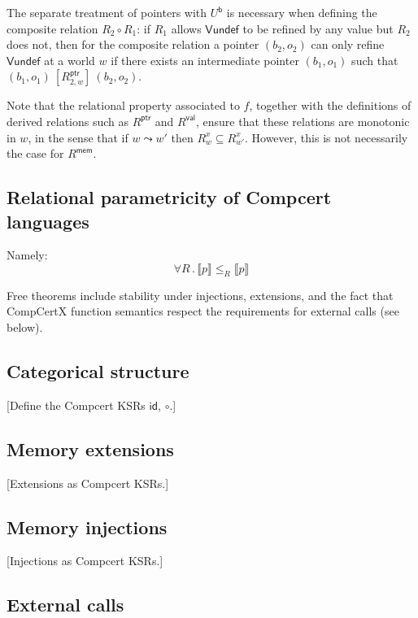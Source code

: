 \documentclass[sigplan,10pt,review,anonymous]{acmart}
\newcommand{\kw}[1]{\ensuremath{ \textsf{#1} }}
\newcommand{\ifr}[1]{\ [{#1}]\ }
\begin{document}
The separate treatment of pointers with $U^\kw{b}$
is necessary when defining the composite relation $R_2 \circ R_1$:
if $R_1$ allows \kw{Vundef} to be refined by any value
but $R_2$ does not,
then for the composite relation
a pointer $(b_2, o_2)$ can only refine \kw{Vundef} at a world $w$
if there exists an intermediate pointer $(b_1, o_1)$
such that $(b_1, o_1) \ifr{R_{2,w}^\kw{ptr}} (b_2, o_2)$.

Note that the relational property associated to $f$,
together with the definitions of
derived relations such as $R^\kw{ptr}$ and $R^\kw{val}$,
ensure that these relations are monotonic in $w$,
in the sense that if $w \leadsto w'$
then $R^x_w \subseteq R^x_{w'}$.
However,
this is not necessarily the case for $R^\kw{mem}$.


\subsection{Relational parametricity of Compcert languages} %

Namely:
\[ \forall R \,.\, \llbracket p \rrbracket \le_R \llbracket p \rrbracket \]

Free theorems include
stability under injections, extensions,
and the fact that CompCertX function semantics
respect the requirements for external calls (see below).


\subsection{Categorical structure} %

[Define the Compcert KSRs \kw{id}, $\circ$.]


\subsection{Memory extensions} %

[Extensions as Compcert KSRs.]


\subsection{Memory injections} %

[Injections as Compcert KSRs.]


\subsection{External calls} %
\end{document}
